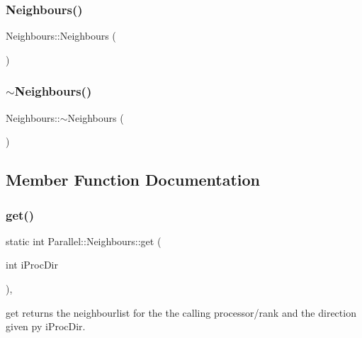 \subsubsection{\texorpdfstring{Neighbours()}{Neighbours()}}
{\footnotesize\ttfamily Neighbours\+::\+Neighbours (\begin{DoxyParamCaption}{ }\end{DoxyParamCaption})}

\mbox{\label{class_parallel_1_1_neighbours_aba4f2d9818bc95b3e84255f04be64541}} 
\subsubsection{\texorpdfstring{$\sim$Neighbours()}{~Neighbours()}}
{\footnotesize\ttfamily Neighbours\+::$\sim$\+Neighbours (\begin{DoxyParamCaption}{ }\end{DoxyParamCaption})}



\subsection{Member Function Documentation}
\mbox{\label{class_parallel_1_1_neighbours_a84653f3e22436280ac5a4689a24e7146}} 
\subsubsection{\texorpdfstring{get()}{get()}}
{\footnotesize\ttfamily static int Parallel\+::\+Neighbours\+::get (\begin{DoxyParamCaption}\item[{int}]{i\+Proc\+Dir }\end{DoxyParamCaption})\hspace{0.3cm}{\ttfamily [inline]}, {\ttfamily [static]}}



get returns the neighbourlist for the the calling processor/rank and the direction given py i\+Proc\+Dir. 



